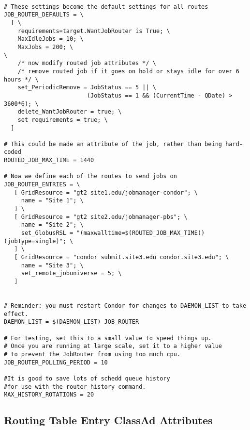 \footnotesize
\begin{verbatim}

# These settings become the default settings for all routes
JOB_ROUTER_DEFAULTS = \
  [ \
    requirements=target.WantJobRouter is True; \
    MaxIdleJobs = 10; \
    MaxJobs = 200; \
\
    /* now modify routed job attributes */ \
    /* remove routed job if it goes on hold or stays idle for over 6 hours */ \
    set_PeriodicRemove = JobStatus == 5 || \
                        (JobStatus == 1 && (CurrentTime - QDate) > 3600*6); \
    delete_WantJobRouter = true; \
    set_requirements = true; \
  ]

# This could be made an attribute of the job, rather than being hard-coded
ROUTED_JOB_MAX_TIME = 1440

# Now we define each of the routes to send jobs on
JOB_ROUTER_ENTRIES = \
   [ GridResource = "gt2 site1.edu/jobmanager-condor"; \
     name = "Site 1"; \
   ] \
   [ GridResource = "gt2 site2.edu/jobmanager-pbs"; \
     name = "Site 2"; \
     set_GlobusRSL = "(maxwalltime=$(ROUTED_JOB_MAX_TIME))(jobType=single)"; \
   ] \
   [ GridResource = "condor submit.site3.edu condor.site3.edu"; \
     name = "Site 3"; \
     set_remote_jobuniverse = 5; \
   ]


# Reminder: you must restart Condor for changes to DAEMON_LIST to take effect.
DAEMON_LIST = $(DAEMON_LIST) JOB_ROUTER

# For testing, set this to a small value to speed things up.
# Once you are running at large scale, set it to a higher value
# to prevent the JobRouter from using too much cpu.
JOB_ROUTER_POLLING_PERIOD = 10

#It is good to save lots of schedd queue history
#for use with the router_history command.
MAX_HISTORY_ROTATIONS = 20
\end{verbatim}
\normalsize



\subsection{\label{RoutingTableAttributes} Routing Table Entry ClassAd Attributes}

